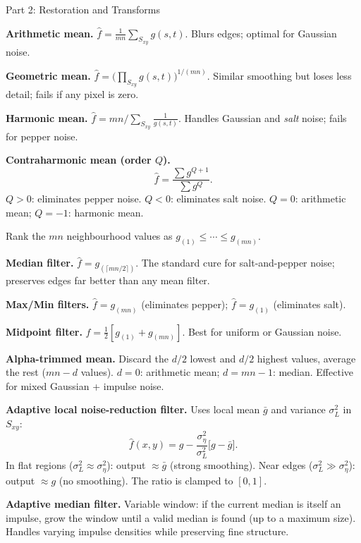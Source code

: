 \documentclass[letterpaper]{article}
\begin{document}
\begin{notes}{Part 2: Restoration and Transforms}

\textbf{Arithmetic mean.} $\hat{f} = \frac{1}{mn}\sum_{S_{xy}}g(s,t)$. Blurs edges; optimal for Gaussian noise.

\textbf{Geometric mean.} $\hat{f} = \bigl(\prod_{S_{xy}}g(s,t)\bigr)^{1/(mn)}$. Similar smoothing but loses less detail; fails if any pixel is zero.

\textbf{Harmonic mean.} $\hat{f} = mn\!\Big/\!\sum_{S_{xy}}\frac{1}{g(s,t)}$. Handles Gaussian and \emph{salt} noise; fails for pepper noise.

\textbf{Contraharmonic mean (order $Q$).}
$$\hat{f} = \frac{\sum g^{Q+1}}{\sum g^{Q}}.$$
$Q>0$: eliminates pepper noise. $Q<0$: eliminates salt noise. $Q=0$: arithmetic mean; $Q=-1$: harmonic mean.


Rank the $mn$ neighbourhood values as $g_{(1)}\le\cdots\le g_{(mn)}$.

\textbf{Median filter.} $\hat{f}=g_{(\lceil mn/2\rceil)}$. The standard cure for salt-and-pepper noise; preserves edges far better than any mean filter.

\textbf{Max/Min filters.} $\hat{f}=g_{(mn)}$ (eliminates pepper); $\hat{f}=g_{(1)}$ (eliminates salt).

\textbf{Midpoint filter.} $\hat{f}=\tfrac{1}{2}[g_{(1)}+g_{(mn)}]$. Best for uniform or Gaussian noise.

\textbf{Alpha-trimmed mean.} Discard the $d/2$ lowest and $d/2$ highest values, average the rest ($mn-d$ values). $d=0$: arithmetic mean; $d=mn-1$: median. Effective for mixed Gaussian + impulse noise.


\textbf{Adaptive local noise-reduction filter.} Uses local mean $\bar g$ and variance $\sigma_L^2$ in $S_{xy}$:
$$\hat{f}(x,y) = g - \frac{\sigma_\eta^2}{\sigma_L^2}\bigl[g-\bar{g}\bigr].$$
In flat regions ($\sigma_L^2\approx\sigma_\eta^2$): output $\approx\bar{g}$ (strong smoothing). Near edges ($\sigma_L^2\gg\sigma_\eta^2$): output $\approx g$ (no smoothing). The ratio is clamped to $[0,1]$.

\textbf{Adaptive median filter.} Variable window: if the current median is itself an impulse, grow the window until a valid median is found (up to a maximum size). Handles varying impulse densities while preserving fine structure.



\end{notes}
\end{document}

